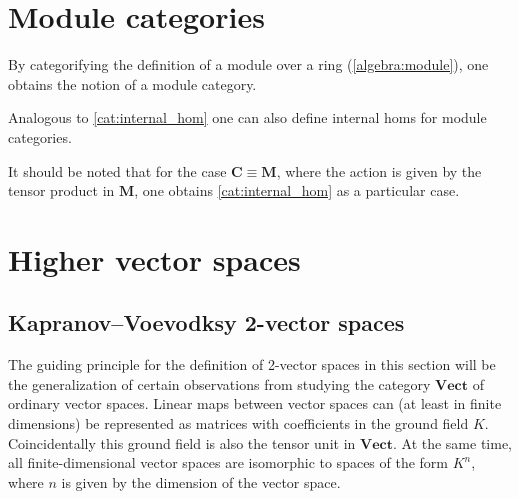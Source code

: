 \section{Module categories}

    By categorifying the definition of a module over a ring (\cref{algebra:module}), one obtains the notion of a module category.

    Analogous to \cref{cat:internal_hom} one can also define internal homs for module categories.
    \begin{property}
        It should be noted that for the case $\mathbf{C}\equiv\mathbf{M}$, where the action is given by the tensor product in $\mathbf{M}$, one obtains \cref{cat:internal_hom} as a particular case.
    \end{property}

\section{Higher vector spaces}
\subsection{Kapranov--Voevodksy 2-vector spaces}

    The guiding principle for the definition of 2-vector spaces in this section will be the generalization of certain observations from studying the category $\mathbf{Vect}$ of ordinary vector spaces. Linear maps between vector spaces can (at least in finite dimensions) be represented as matrices with coefficients in the ground field $K$. Coincidentally this ground field is also the tensor unit in $\mathbf{Vect}$. At the same time, all finite-dimensional vector spaces are isomorphic to spaces of the form $K^n$, where $n$ is given by the dimension of the vector space.

